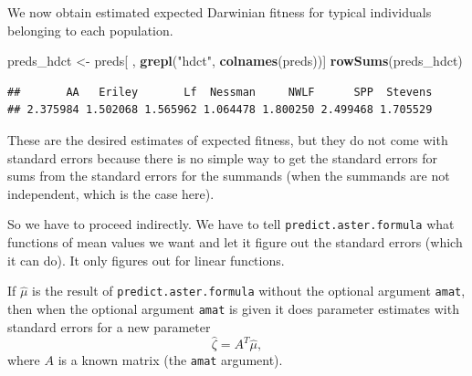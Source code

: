 \documentclass[
  ignorenonframetext,
]{beamer}
\newenvironment{Shaded}{\begin{snugshade}}{\end{snugshade}}
\newcommand{\FunctionTok}[1]{\textcolor[rgb]{0.13,0.29,0.53}{\textbf{#1}}}
\newcommand{\NormalTok}[1]{#1}
\newcommand{\OtherTok}[1]{\textcolor[rgb]{0.56,0.35,0.01}{#1}}
\newcommand{\StringTok}[1]{\textcolor[rgb]{0.31,0.60,0.02}{#1}}
\begin{document}
\begin{frame}[fragile]{}
\protect\hypertarget{section-35}{}
We now obtain estimated expected Darwinian fitness for typical
individuals belonging to each population.

\vspace{12pt}
\tiny

\begin{Shaded}
\begin{Highlighting}[]
\NormalTok{preds\_hdct }\OtherTok{\textless{}{-}}\NormalTok{ preds[ , }\FunctionTok{grepl}\NormalTok{(}\StringTok{"hdct"}\NormalTok{, }\FunctionTok{colnames}\NormalTok{(preds))]}
\FunctionTok{rowSums}\NormalTok{(preds\_hdct)}
\end{Highlighting}
\end{Shaded}

\begin{verbatim}
##       AA   Eriley       Lf  Nessman     NWLF      SPP  Stevens 
## 2.375984 1.502068 1.565962 1.064478 1.800250 2.499468 1.705529
\end{verbatim}
\end{frame}

\begin{frame}{}
\protect\hypertarget{section-36}{}
These are the desired estimates of expected fitness, but they do not
come with standard errors because there is no simple way to get the
standard errors for sums from the standard errors for the summands (when
the summands are not independent, which is the case here).

So we have to proceed indirectly. We have to tell
\texttt{predict.aster.formula} what functions of mean values we want and
let it figure out the standard errors (which it can do). It only figures
out for linear functions.

If \(\hat\mu\) is the result of \texttt{predict.aster.formula} without
the optional argument \texttt{amat}, then when the optional argument
\texttt{amat} is given it does parameter estimates with standard errors
for a new parameter \[
  \hat\zeta = A^T\hat\mu,
\] where \(A\) is a known matrix (the \texttt{amat} argument).
\end{frame}
\end{document}
